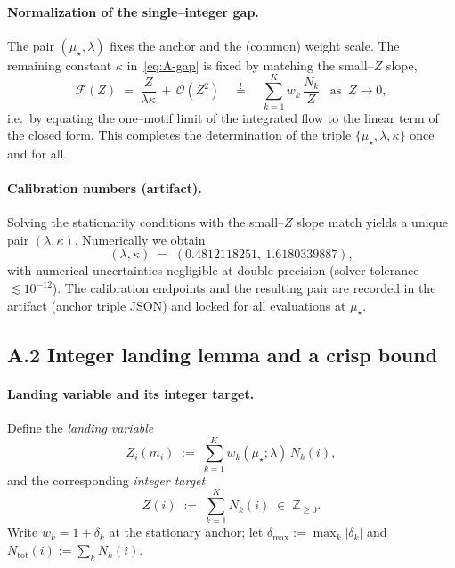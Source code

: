 \documentclass[epjc3]{svjour3}
\begin{document}
\paragraph{Normalization of the single--integer gap.}
The pair $(\mu_\star,\lambda)$ fixes the anchor and the (common) weight scale. The remaining constant $\kappa$ in~\eqref{eq:A-gap} is fixed by matching the small--$Z$ slope,
\begin{equation}
  \mathcal F(Z)\;=\;\frac{Z}{\lambda\kappa}\,+\,\mathcal O(Z^2)
  \quad\stackrel{!}{=}\quad
  \sum_{k=1}^K w_k\,\frac{N_k}{Z}\;\;\;\text{as}\;\;Z\to 0,
  \label{eq:A-kappa-match}
\end{equation}
i.e.\ by equating the one--motif limit of the integrated flow to the linear term of the closed form. This completes the determination of the triple $\{\mu_\star,\lambda,\kappa\}$ once and for all.

\paragraph{Calibration numbers (artifact).}
Solving the stationarity conditions with the small--$Z$ slope match yields a unique pair $(\lambda,\kappa)$. Numerically we obtain
\[
  (\lambda,\kappa)\;=\;(0.4812118251,\ 1.6180339887),
\]
with numerical uncertainties negligible at double precision (solver tolerance $\lesssim 10^{-12}$). The calibration endpoints and the resulting pair are recorded in the artifact (anchor triple JSON) and locked for all evaluations at $\mu_\star$.

\subsection*{A.2 Integer landing lemma and a crisp bound}

\paragraph{Landing variable and its integer target.}
Define the \emph{landing variable}
\begin{equation}
  Z_i(m_i)\;:=\;\sum_{k=1}^K w_k(\mu_\star;\lambda)\,N_k(i),
  \label{eq:A-Zi}
\end{equation}
and the corresponding \emph{integer target}
\begin{equation}
  Z(i)\;:=\;\sum_{k=1}^K N_k(i)\;\in\;\mathbb Z_{\ge 0}.
  \label{eq:A-Zint}
\end{equation}
Write $w_k=1+\delta_k$ at the stationary anchor; let $\delta_{\max}:=\max_k|\delta_k|$ and $N_{\mathrm{tot}}(i):=\sum_k N_k(i)$.
\end{document}
